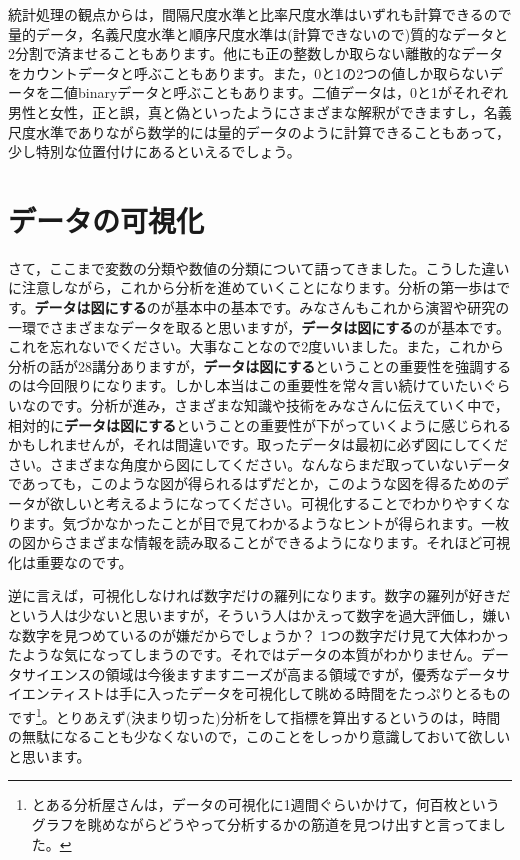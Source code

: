 \documentclass{ltjsbook}
\begin{document}
統計処理の観点からは，間隔尺度水準と比率尺度水準はいずれも計算できるので量的データ，名義尺度水準と順序尺度水準は(計算できないので)質的なデータと2分割で済ませることもあります。他にも正の整数しか取らない離散的なデータをカウントデータと呼ぶこともあります。また，0と1の2つの値しか取らないデータを二値binaryデータと呼ぶこともあります。二値データは，0と1がそれぞれ男性と女性，正と誤，真と偽といったようにさまざまな解釈ができますし，名義尺度水準でありながら数学的には量的データのように計算できることもあって，少し特別な位置付けにあるといえるでしょう。

\section{データの可視化}
\label{dataVisualization}
さて，ここまで変数の分類や数値の分類について語ってきました。こうした違いに注意しながら，これから分析を進めていくことになります。分析の第一歩はです。\textbf{データは図にする}のが基本中の基本です。みなさんもこれから演習や研究の一環でさまざまなデータを取ると思いますが，\textbf{データは図にする}のが基本です。これを忘れないでください。大事なことなので2度いいました。また，これから分析の話が28講分ありますが，\textbf{データは図にする}ということの重要性を強調するのは今回限りになります。しかし本当はこの重要性を常々言い続けていたいぐらいなのです。分析が進み，さまざまな知識や技術をみなさんに伝えていく中で，相対的に\textbf{データは図にする}ということの重要性が下がっていくように感じられるかもしれませんが，それは間違いです。取ったデータは最初に必ず図にしてください。さまざまな角度から図にしてください。なんならまだ取っていないデータであっても，このような図が得られるはずだとか，このような図を得るためのデータが欲しいと考えるようになってください。可視化することでわかりやすくなります。気づかなかったことが目で見てわかるようなヒントが得られます。一枚の図からさまざまな情報を読み取ることができるようになります。それほど可視化は重要なのです。

逆に言えば，可視化しなければ数字だけの羅列になります。数字の羅列が好きだという人は少ないと思いますが，そういう人はかえって数字を過大評価し，嫌いな数字を見つめているのが嫌だからでしょうか？ 1つの数字だけ見て大体わかったような気になってしまうのです。それではデータの本質がわかりません。データサイエンスの領域は今後ますますニーズが高まる領域ですが，優秀なデータサイエンティストは手に入ったデータを可視化して眺める時間をたっぷりとるものです\footnote{とある分析屋さんは，データの可視化に1週間ぐらいかけて，何百枚というグラフを眺めながらどうやって分析するかの筋道を見つけ出すと言ってました。}。とりあえず(決まり切った)分析をして指標を算出するというのは，時間の無駄になることも少なくないので，このことをしっかり意識しておいて欲しいと思います。
\end{document}
